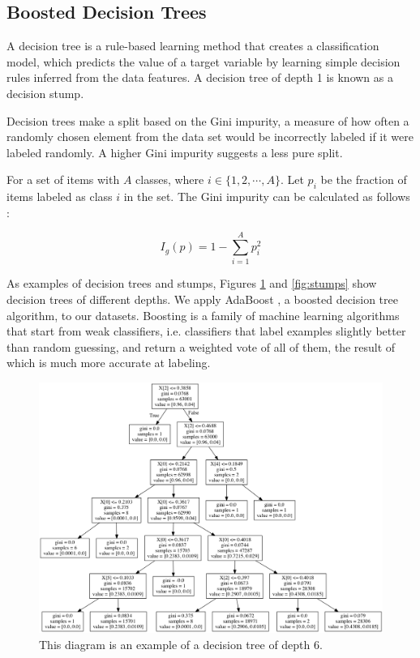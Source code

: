 \documentclass[5p]{elsarticle}
\begin{document}
\subsection{Boosted Decision Trees}

A decision tree is a rule-based learning method \cite{dva} that creates a classification model, which predicts the value of a target variable by learning simple decision rules inferred from the data features. A decision tree of depth 1 is known as a decision stump.

Decision trees make a split based on the Gini impurity, a measure of how often a randomly chosen element from the data set would be incorrectly labeled if it were labeled randomly. A higher Gini impurity suggests a less pure split.

For a set of items with $A$ classes, where $i \in \{ 1, 2, \cdots , A \} $. Let $p_i$ be the fraction of items labeled as class $i$ in the set. The Gini impurity can be calculated as follows \cite{devet}:

\begin{equation} I_g(p)=1-\sum_{i=1}^{A}p_i^2 
\end{equation}

As examples of decision trees and stumps, Figures \ref{fig:tree} and \ref{fig:stumps} show decision trees of different depths.	
We apply AdaBoost \cite{deset}, a boosted decision tree algorithm, to our datasets. Boosting is a family of machine learning algorithms that start from weak classifiers, i.e. classifiers that label examples slightly better than random guessing, and return a weighted vote of all of them, the result of which is much more accurate at labeling.

\begin{figure}[htbp]
    \centering
    \includegraphics[width=\linewidth]{tree.png}
    \caption{This diagram is an example of a decision tree of depth 6.}
    \label{fig:tree}
\end{figure}
\end{document}
